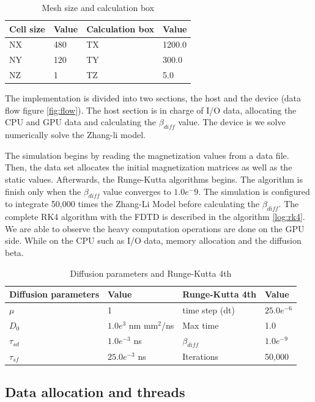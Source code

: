 \begin{table}[h]
\centering
\begin{tabular}{| l | l | l | l |}
\hline
Cell size & Value & Calculation box & Value \\
\hline
 NX & 480 &  TX  & 1200.0   \\
\hline
 NY & 120 &  TY  & 300.0  \\
\hline
 NZ &	1 &  TZ  & 5.0   \\
\hline
\end{tabular}
\caption{Mesh size and calculation box}
\label{tab:mesh}
\end{table}

The implementation is divided into two sections, the host and the device (data flow figure \ref{fig:flow}). The host section is in charge of I/O data, allocating the CPU and GPU data and calculating the $\beta_{diff}$ value. The device is we solve numerically solve the Zhang-li model.

The simulation begins by reading the magnetization values from a data file. Then, the data set allocates the initial magnetization matrices as well as the static values. Afterwards, the Runge-Kutta algorithms begins. The algorithm is finish only when the $\beta_{diff}$ value converges to $1.0e^-9$. The simulation is configured to integrate 50,000 times the Zhang-Li Model before calculating the $\beta_{diff}$. The complete RK4 algorithm with the FDTD is described in the algorithm \ref{log:rk4}. We are able to observe the heavy computation operations are done on the GPU side. While on the CPU such as I/O data, memory allocation and the diffusion beta.

\begin{table}[h]
\centering
\begin{tabular}{| l | l | l | l |}
\hline
Diffusion parameters& Value & Runge-Kutta 4th & Value \\
\hline 
$\mu$ & 1 &  time step (dt) &   $25.0e^{-6}$   \\
\hline
$D_{0}$ & $1.0e^{3}$ nm mm$^2$/ns  & Max time  & 1.0  \\
\hline
$\tau_{sd}$ & $1.0e^{-3}$ ns  & $\beta_{diff}$ & $1.0e^{-9}$ \\
\hline
$\tau_{sf}$ & $25.0e^{-3}$ ns  & Iterations & 50,000 \\
\hline
\end{tabular}
\caption{Diffusion parameters and Runge-Kutta 4th}
\label{tab:drk}
\end{table}

\subsection{Data allocation and threads}

